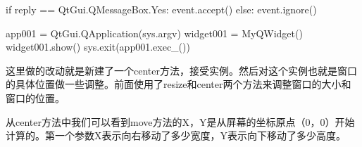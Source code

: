 \documentclass[11pt,oneside]{book}
\begin{document}
\begin{common-format}
\begin{python}
        if reply == QtGui.QMessageBox.Yes:
            event.accept()
        else:
            event.ignore()

app001 = QtGui.QApplication(sys.argv)
widget001 = MyQWidget()
widget001.show()
sys.exit(app001.exec_())
\end{python}
这里做的改动就是新建了一个center方法，接受实例。然后对这个实例也就是窗口的具体位置做一些调整。前面使用了resize和center两个方法来调整窗口的大小和窗口的位置。

从center方法中我们可以看到move方法的X，Y是从屏幕的坐标原点（0，0）开始计算的。第一个参数X表示向右移动了多少宽度，Y表示向下移动了多少高度。


\end{common-format}
\end{document}
